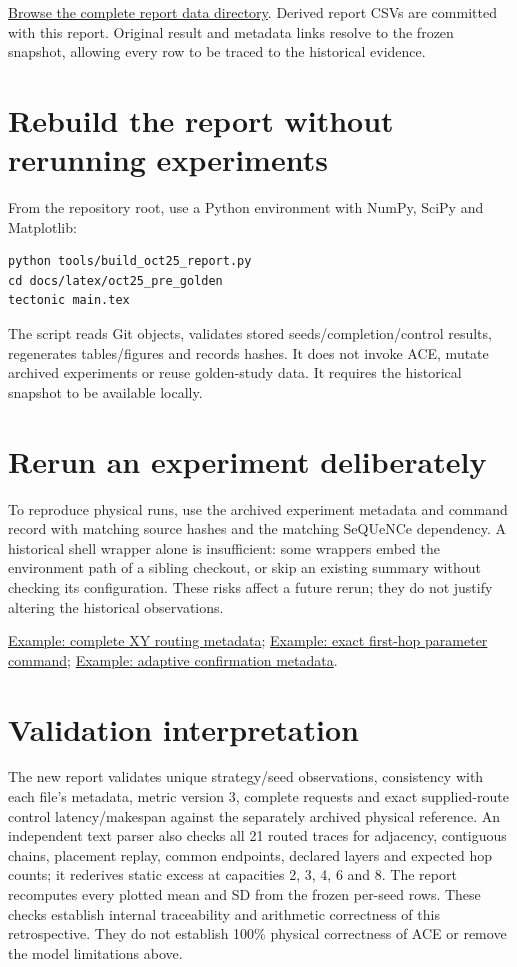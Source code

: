 \documentclass[11pt,a4paper,oneside]{report}
\newcommand{\repo}{https://github.com/sanjeevkrishnaa/Compiler-Driven-ACE}
\newcommand{\snap}{4aa334542e9b9c8fe7a5f9cc8fe48ee2e4d2fa55}
\newcommand{\src}[2]{\href{\repo/blob/\snap/#1}{#2}}
\begin{document}
\href{\repo/tree/codex/ace-scheduler-correctness/docs/latex/oct25_pre_golden/data}{Browse the complete report data directory}. Derived report CSVs are committed with this report. Original result and metadata links resolve to the frozen snapshot, allowing every row to be traced to the historical evidence.

\section{Rebuild the report without rerunning experiments}
From the repository root, use a Python environment with NumPy, SciPy and Matplotlib:
\begin{verbatim}
python tools/build_oct25_report.py
cd docs/latex/oct25_pre_golden
tectonic main.tex
\end{verbatim}
The script reads Git objects, validates stored seeds/completion/control results, regenerates tables/figures and records hashes. It does not invoke ACE, mutate archived experiments or reuse golden-study data. It requires the historical snapshot to be available locally.

\section{Rerun an experiment deliberately}
To reproduce physical runs, use the archived experiment metadata and command record with matching source hashes and the matching SeQUeNCe dependency. A historical shell wrapper alone is insufficient: some wrappers embed the environment path of a sibling checkout, or skip an existing summary without checking its configuration. These risks affect a future rerun; they do not justify altering the historical observations.

\src{results/routing\_study\_2026-10-25/runs/xy/metadata.json}{Example: complete XY routing metadata};
\src{results/overnight\_2026-10-25/P2\_grid/P2\_cm3\_tm4/command.txt}{Example: exact first-hop parameter command};
\src{results/congestion\_adaptive\_confirm\_2026-10-25/xy/metadata.json}{Example: adaptive confirmation metadata}.

\section{Validation interpretation}
The new report validates unique strategy/seed observations, consistency with each file's metadata, metric version 3, complete requests and exact supplied-route control latency/makespan against the separately archived physical reference. An independent text parser also checks all 21 routed traces for adjacency, contiguous chains, placement replay, common endpoints, declared layers and expected hop counts; it rederives static excess at capacities 2, 3, 4, 6 and 8. The report recomputes every plotted mean and SD from the frozen per-seed rows. These checks establish internal traceability and arithmetic correctness of this retrospective. They do not establish 100\% physical correctness of ACE or remove the model limitations above.
\end{document}
